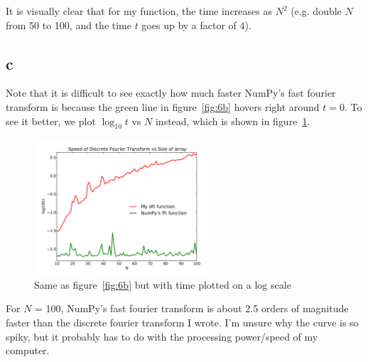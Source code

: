 \documentclass[11pt,letterpaper]{article}
\begin{document}
It is visually clear that for my function, the time increases as $N^2$ (e.g. 
double $N$ from 50 to 100, and the time $t$ goes up by a factor of 4).

\subsection*{c}

Note that it is difficult to see exactly how much faster NumPy's fast fourier
transform is because the green line in figure~\ref{fig:6b} hovers right around $t=0$.
To see it better, we plot $\log_{10} t$ vs $N$ instead, which is shown 
in figure~\ref{fig:6c}. 

\begin{figure}[bth]
\centering
\includegraphics[width=0.6\textwidth]{ws6-c.pdf}
\caption{Same as figure~\ref{fig:6b} but with time plotted on a log scale}
\label{fig:6c}
\end{figure}

For $N$ = 100, NumPy's fast fourier transform is about 2.5 orders of magnitude 
faster than the discrete fourier transform I wrote. I'm unsure why the curve 
is so spiky, but it probably has to do with the processing power/speed of my
computer.
\end{document}
